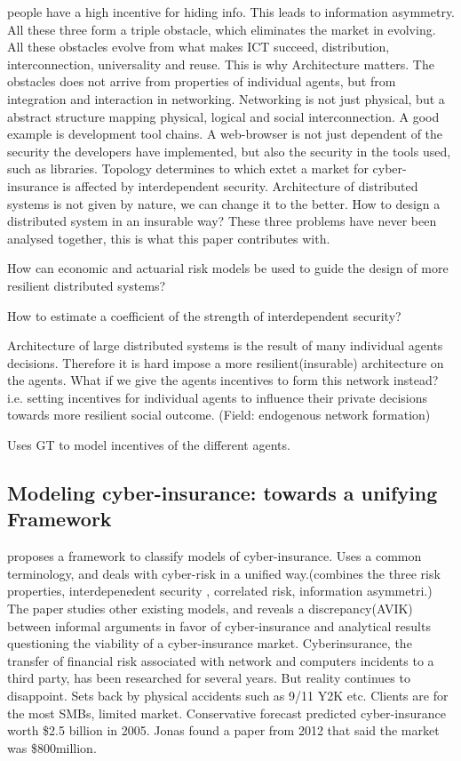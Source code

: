 people have a high incentive for hiding info. This leads to information asymmetry. 
All these three form a triple obstacle, which eliminates the market in evolving. 
All these obstacles evolve from what makes ICT succeed, distribution, interconnection, universality and reuse.
This is why Architecture matters. The obstacles does not arrive from properties of individual agents, 
but from integration and interaction in networking. Networking is not just physical, 
but a abstract structure mapping physical, logical and social interconnection.
 A good example is development tool chains.
  A web-browser is not just dependent of the security the developers have implemented, 
  but also the security in the tools used, such as libraries.
Topology determines to which extet a market for cyber-insurance is affected by interdependent security. Architecture of distributed systems is not given by nature, we can change it to the better.  How to design a distributed system in an insurable way?
These three problems have never been analysed together, this is what this paper contributes with. 

How can economic and actuarial risk models be used to guide the design of more resilient distributed systems?

How to estimate a coefficient of the strength of interdependent security?

Architecture of large distributed systems is the result of many individual agents decisions. 
Therefore it is hard impose a more resilient(insurable) architecture on the agents. What if we give the agents incentives to form this network instead? i.e. setting incentives for individual agents to influence their private decisions towards more resilient social outcome. (Field: endogenous network formation)

Uses GT to model incentives of the different agents. 

\subsection{Modeling cyber-insurance: towards a unifying Framework}
\cite{bohme2010modeling}
proposes a framework to classify models of cyber-insurance. Uses a common terminology, 
and deals with cyber-risk in a unified way.(combines the three risk properties, interdepenedent security
, correlated risk, information asymmetri.)
The paper studies other existing models, and reveals a discrepancy(AVIK) between informal arguments in 
favor of cyber-insurance and analytical results questioning the viability of a cyber-insurance market.
Cyberinsurance, the transfer of financial risk associated with network and computers 
incidents to a third party, has been researched for several years. But reality continues to disappoint. 
Sets back by physical accidents such as 9/11 Y2K etc. Clients are for the most SMBs, limited market. 
Conservative forecast predicted cyber-insurance worth \$2.5 billion in 2005. Jonas found a paper from 2012 that said the market was \$800million.

